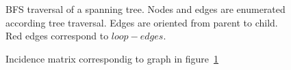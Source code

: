 \documentclass[a4paper,11pt]{article}
\begin{document}
\begin{figure}
\centering

\caption{BFS traversal of a spanning tree. Nodes and edges are 
enumerated according tree traversal. Edges are oriented from 
parent to child. Red edges correspond to 
$loop-edges$.}
\label{fig:M1}
\end{figure}

\begin{figure}
\centering

\caption{Incidence matrix correspondig to graph in figure~\ref{fig:M1}}
\label{fig:M2}
\end{figure}
\end{document}
